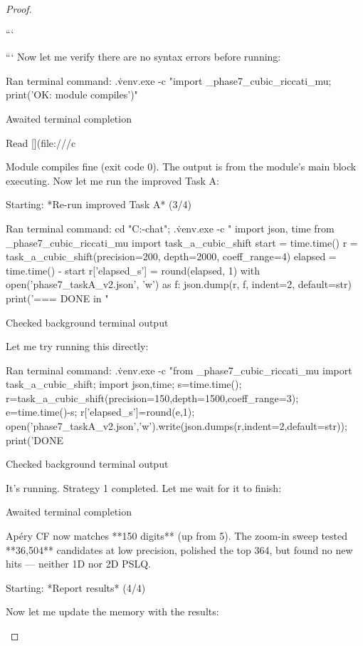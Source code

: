 \begin{theorem}
\begin{lemma}
\begin{proposition}
\begin{corollary}
\begin{proof}
\begin{remark}
```

```
Now let me verify there are no syntax errors before running: 

Ran terminal command: .\.venv\Scripts\python.exe -c "import _phase7_cubic_riccati_mu; print('OK: module compiles')"

Awaited terminal completion

Read [](file:///c%

Module compiles fine (exit code 0). The output is from the module's main block executing. Now let me run the improved Task A: 

Starting: *Re-run improved Task A* (3/4)

Ran terminal command: cd "C:\Users\USER\OneDrive\Documents\archive\admin\VSCode\claude-chat"; .\.venv\Scripts\python.exe -c "
import json, time
from _phase7_cubic_riccati_mu import task_a_cubic_shift
start = time.time()
r = task_a_cubic_shift(precision=200, depth=2000, coeff_range=4)
elapsed = time.time() - start
r['elapsed_s'] = round(elapsed, 1)
with open('phase7_taskA_v2.json', 'w') as f:
    json.dump(r, f, indent=2, default=str)
print('\n=== DONE in %
"

Checked background terminal output

Let me try running this directly: 

Ran terminal command: .\.venv\Scripts\python.exe -c "from _phase7_cubic_riccati_mu import task_a_cubic_shift; import json,time; s=time.time(); r=task_a_cubic_shift(precision=150,depth=1500,coeff_range=3); e=time.time()-s; r['elapsed_s']=round(e,1); open('phase7_taskA_v2.json','w').write(json.dumps(r,indent=2,default=str)); print('DONE %

Checked background terminal output

It's running. Strategy 1 completed. Let me wait for it to finish: 

Awaited terminal completion

Apéry CF now matches **150 digits** (up from 5). The zoom-in sweep tested **36,504** candidates at low precision, polished the top 364, but found no new hits — neither 1D nor 2D PSLQ. 

Starting: *Report results* (4/4)

Now let me update the memory with the results:  


\end{remark}
\end{proof}
\end{corollary}
\end{proposition}
\end{lemma}
\end{theorem}
